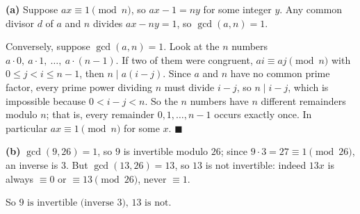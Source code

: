 \textbf{(a)} Suppose $ax\equiv1\pmod n$, so $ax-1=ny$ for some integer $y$. Any common divisor $d$ of $a$ and $n$ divides $ax-ny=1$, so $\gcd(a,n)=1$.

Conversely, suppose $\gcd(a,n)=1$. Look at the $n$ numbers $a\cdot0,\ a\cdot1,\ \dots,\ a\cdot(n-1)$. If two of them were congruent, $ai\equiv aj\pmod n$ with $0\le j<i\le n-1$, then $n\mid a(i-j)$. Since $a$ and $n$ have no common prime factor, every prime power dividing $n$ must divide $i-j$, so $n\mid i-j$, which is impossible because $0<i-j<n$. So the $n$ numbers have $n$ different remainders modulo $n$; that is, every remainder $0,1,\dots,n-1$ occurs exactly once. In particular $ax\equiv1\pmod n$ for some $x$. $\blacksquare$

\textbf{(b)} $\gcd(9,26)=1$, so $9$ is invertible modulo $26$; since $9\cdot3=27\equiv1\pmod{26}$, an inverse is $3$. But $\gcd(13,26)=13$, so $13$ is not invertible: indeed $13x$ is always $\equiv0$ or $\equiv13\pmod{26}$, never $\equiv1$.

So $\boxed{9\text{ is invertible (inverse }3\text{), }13\text{ is not}}$.
